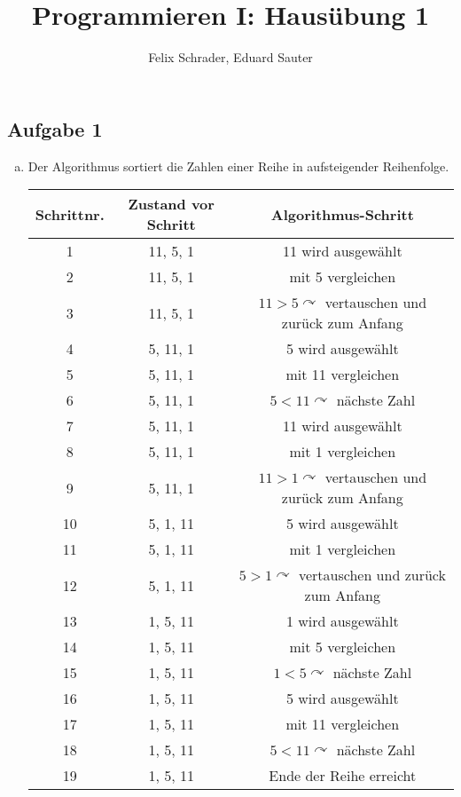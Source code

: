 \documentclass[11pt]{article}
\author{Felix Schrader, Eduard Sauter}
\title{Programmieren I: Haus\"ubung 1}
\begin{document}
\maketitle

\subsection*{Aufgabe 1}
\begin{enumerate}[a)]

  \item Der Algorithmus sortiert die Zahlen einer Reihe in aufsteigender
    Reihenfolge.

    \begin{table}[h!]
      \centering
      \begin{tabular}{|c|c|c|}
        \hline 
        Schrittnr. & Zustand vor Schritt & Algorithmus-Schritt \\ 
        \hline 
        1 & 11, 5, 1 & 11 wird ausgew\"ahlt \\ 
        \hline 
        2 & 11, 5, 1 & mit 5 vergleichen \\ 
        \hline 
        3 & 11, 5, 1 & $11>5\curvearrowright$ vertauschen und zur\"uck zum Anfang \\ 
        \hline 
        4 & 5, 11, 1 & 5 wird ausgew\"ahlt \\ 
        \hline 
        5 & 5, 11, 1 & mit 11 vergleichen \\ 
        \hline 
        6 & 5, 11, 1 & $5<11\curvearrowright$ n\"achste Zahl \\ 
        \hline 
        7 & 5, 11, 1 & 11 wird ausgew\"ahlt \\ 
        \hline 
        8 & 5, 11, 1 & mit 1 vergleichen \\ 
        \hline 
        9 & 5, 11, 1 & $11>1\curvearrowright$ vertauschen und zur\"uck zum Anfang \\ 
        \hline 
        10 & 5, 1, 11 & 5 wird ausgew\"ahlt \\ 
        \hline 
        11 & 5, 1, 11 & mit 1 vergleichen \\ 
        \hline 
        12 & 5, 1, 11 & $5>1\curvearrowright$ vertauschen und zur\"uck zum Anfang \\ 
        \hline 
        13 & 1, 5, 11 & 1 wird ausgew\"ahlt \\ 
        \hline 
        14 & 1, 5, 11 & mit 5 vergleichen \\ 
        \hline 
        15 & 1, 5, 11 & $1<5\curvearrowright$ n\"achste Zahl \\ 
        \hline 
        16 & 1, 5, 11 & 5 wird ausgew\"ahlt \\ 
        \hline 
        17 & 1, 5, 11 & mit 11 vergleichen \\ 
        \hline 
        18 & 1, 5, 11 & $5<11\curvearrowright$ n\"achste Zahl \\ 
        \hline 
        19 & 1, 5, 11 & Ende der Reihe erreicht \\ 
        \hline 
      \end{tabular} 
    \end{table}



\end{enumerate}
\end{document}
